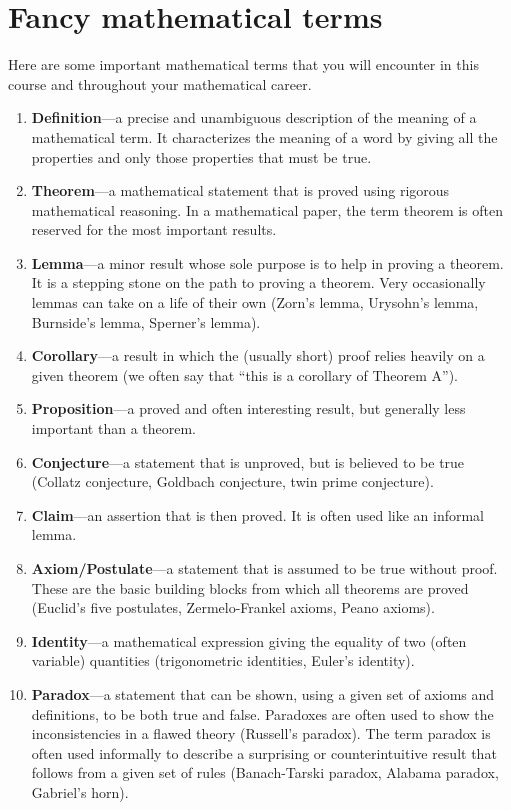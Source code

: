 \chapter{Fancy mathematical terms}
\label{appendix:fancy_math_terms}

Here are some important mathematical terms that you will encounter in this course and throughout your mathematical career.

\begin{enumerate}
\item
\textbf{Definition}---a precise and unambiguous description of the meaning of a mathematical term.  It characterizes the meaning of a word by giving all the properties and only those properties that must be true.
\item
\textbf{Theorem}---a mathematical statement that is proved using rigorous mathematical reasoning.  In a mathematical paper, the term theorem is often reserved for the most important results.
\item
\textbf{Lemma}---a minor result whose sole purpose is to help in proving a theorem.  It is a stepping stone on the path to proving a theorem. Very occasionally lemmas can take on a life of their own (Zorn's lemma, Urysohn's lemma, Burnside's lemma, Sperner's lemma).
\item
\textbf{Corollary}---a result in which the (usually short) proof relies heavily on a given theorem (we often say that ``this is a corollary of Theorem A'').
\item
\textbf{Proposition}---a proved and often interesting result, but generally less important than a theorem.
\item
\textbf{Conjecture}---a statement that is unproved, but is believed to be true (Collatz conjecture, Goldbach conjecture, twin prime conjecture).
\item
\textbf{Claim}---an assertion that is then proved.  It is often used like an informal lemma.
\item
\textbf{Axiom/Postulate}---a statement that is assumed to be true without proof. These are the basic building blocks from which all theorems are proved (Euclid's five postulates, Zermelo-Frankel axioms, Peano axioms).
\item
\textbf{Identity}---a mathematical expression giving the equality of two (often variable) quantities (trigonometric identities, Euler's identity).
\item
\textbf{Paradox}---a statement that can be shown, using a given set of axioms and definitions, to be both true and false. Paradoxes are often used to show the inconsistencies in a flawed theory (Russell's paradox).  The term paradox is often used informally to describe a surprising or counterintuitive result that follows from a given set of rules (Banach-Tarski paradox, Alabama paradox, Gabriel's horn).
\end{enumerate}